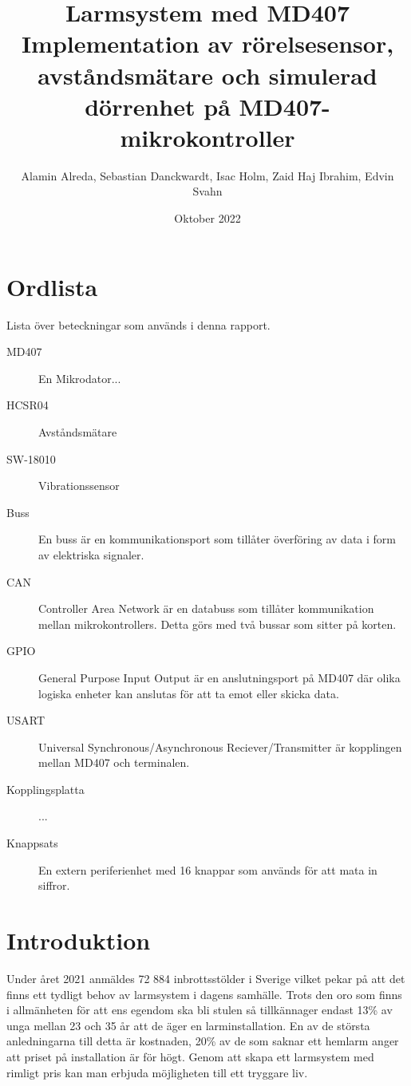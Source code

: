 \documentclass{article}
\title{\textbf{Larmsystem med MD407}\\ 
        \hspace{10cm}
        \small Implementation av rörelsesensor, avståndsmätare och simulerad dörrenhet på MD407-mikrokontroller}
\author{Alamin Alreda, Sebastian Danckwardt, Isac Holm, Zaid Haj Ibrahim, Edvin Svahn}
\date{Oktober 2022}
\begin{document}
\maketitle
\newpage
\tableofcontents
\newpage
\section*{Ordlista}
Lista över beteckningar som används i denna rapport.
\begin{description}

\item[MD407] En Mikrodator...

\item[HCSR04] Avståndsmätare

\item[SW-18010] Vibrationssensor

\item[Buss] En buss är en kommunikationsport som tillåter överföring av data i form av elektriska signaler.

\item[CAN] Controller Area Network är en databuss som tillåter kommunikation mellan mikrokontrollers. Detta görs med två bussar som sitter på korten.

\item[GPIO] General Purpose Input Output är en anslutningsport på MD407 där olika logiska enheter kan anslutas för att ta emot eller skicka data.

\item[USART] Universal Synchronous/Asynchronous Reciever/Transmitter är kopplingen mellan MD407 och terminalen.

\item[Kopplingsplatta] ...

\item[Knappsats] En extern periferienhet med 16 knappar som används för att mata in siffror.

\item[]


\end{description}
 \newpage

\setcounter{page}{1}
\section{Introduktion}
Under året 2021 anmäldes 72 884 inbrottsstölder i Sverige vilket pekar på att det finns ett tydligt behov av larmsystem i dagens samhälle.\cite{BRa} Trots den oro som finns i allmänheten för att ens egendom ska bli stulen så tillkännager endast 13\% av unga mellan 23 och 35 år att de äger en larminstallation.\cite{MoFor} En av de största anledningarna till detta är kostnaden, 20\% av de som saknar ett hemlarm anger att priset på installation är för högt.\cite{MoFor} Genom att skapa ett larmsystem med rimligt pris kan man erbjuda möjligheten till ett tryggare liv.
\end{document}
